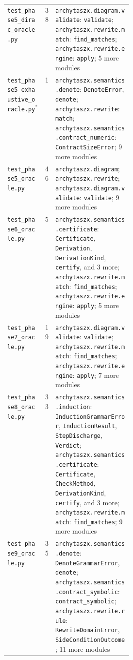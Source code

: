 \begin{xltabular}{\linewidth}{@{}>{\raggedright\arraybackslash}p{0.3\linewidth}r>{\raggedright\arraybackslash}X@{}}
\texttt{test\_\allowbreak{}phase5\_\allowbreak{}dirac\_\allowbreak{}oracle.py} & 38 & \texttt{archytaszx.\allowbreak{}diagram.\allowbreak{}validate}: \texttt{validate}; \texttt{archytaszx.\allowbreak{}rewrite.\allowbreak{}match}: \texttt{find\_\allowbreak{}matches}; \texttt{archytaszx.\allowbreak{}rewrite.\allowbreak{}engine}: \texttt{apply}; 5 more modules \\
\texttt{test\_\allowbreak{}phase5\_\allowbreak{}exhaustive\_\allowbreak{}oracle.py}$^{\ast}$ & 1 & \texttt{archytaszx.\allowbreak{}semantics.\allowbreak{}denote}: \texttt{DenoteError}, \texttt{denote}; \texttt{archytaszx.\allowbreak{}rewrite}: \texttt{match}; \texttt{archytaszx.\allowbreak{}semantics.\allowbreak{}contract\_\allowbreak{}numeric}: \texttt{ContractSizeError}; 9 more modules \\
\texttt{test\_\allowbreak{}phase5\_\allowbreak{}oracle.py} & 46 & \texttt{archytaszx.\allowbreak{}diagram}; \texttt{archytaszx.\allowbreak{}rewrite}; \texttt{archytaszx.\allowbreak{}diagram.\allowbreak{}validate}: \texttt{validate}; 9 more modules \\
\texttt{test\_\allowbreak{}phase6\_\allowbreak{}oracle.py} & 5 & \texttt{archytaszx.\allowbreak{}semantics.\allowbreak{}certificate}: \texttt{Certificate}, \texttt{Derivation}, \texttt{DerivationKind}, \texttt{certify}, and 3 more; \texttt{archytaszx.\allowbreak{}rewrite.\allowbreak{}match}: \texttt{find\_\allowbreak{}matches}; \texttt{archytaszx.\allowbreak{}rewrite.\allowbreak{}engine}: \texttt{apply}; 5 more modules \\
\texttt{test\_\allowbreak{}phase7\_\allowbreak{}oracle.py} & 19 & \texttt{archytaszx.\allowbreak{}diagram.\allowbreak{}validate}: \texttt{validate}; \texttt{archytaszx.\allowbreak{}rewrite.\allowbreak{}match}: \texttt{find\_\allowbreak{}matches}; \texttt{archytaszx.\allowbreak{}rewrite.\allowbreak{}engine}: \texttt{apply}; 7 more modules \\
\texttt{test\_\allowbreak{}phase8\_\allowbreak{}oracle.py} & 33 & \texttt{archytaszx.\allowbreak{}semantics.\allowbreak{}induction}: \texttt{InductionGrammarError}, \texttt{InductionResult}, \texttt{StepDischarge}, \texttt{Verdict}; \texttt{archytaszx.\allowbreak{}semantics.\allowbreak{}certificate}: \texttt{Certificate}, \texttt{CheckMethod}, \texttt{DerivationKind}, \texttt{certify}, and 3 more; \texttt{archytaszx.\allowbreak{}rewrite.\allowbreak{}match}: \texttt{find\_\allowbreak{}matches}; 9 more modules \\
\texttt{test\_\allowbreak{}phase9\_\allowbreak{}oracle.py} & 35 & \texttt{archytaszx.\allowbreak{}semantics.\allowbreak{}denote}: \texttt{DenoteGrammarError}, \texttt{denote}; \texttt{archytaszx.\allowbreak{}semantics.\allowbreak{}contract\_\allowbreak{}symbolic}: \texttt{contract\_\allowbreak{}symbolic}; \texttt{archytaszx.\allowbreak{}rewrite.\allowbreak{}rule}: \texttt{RewriteDomainError}, \texttt{SideConditionOutcome}; 11 more modules \\

\end{xltabular}
